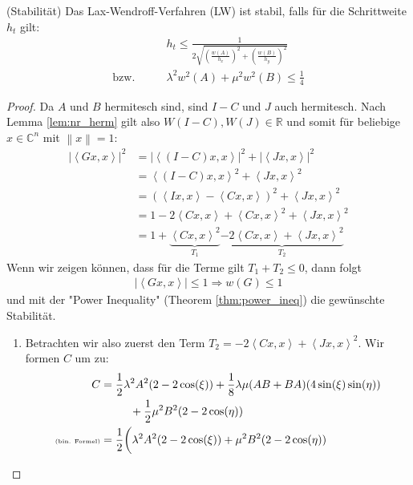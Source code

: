 \begin{thm}(Stabilität)
    Das Lax-Wendroff-Verfahren (LW) ist stabil, falls für die Schrittweite $h_t$ gilt:
    \begin{align}
        & h_t  \le \frac{1}{2 \sqrt{ (\frac{w(A)}{h_x})^2 + (\frac{w(B)}{h_y})^2 } } \\
        \text{bzw.} \qquad & \lambda^2 w^2(A) + \mu^2 w^2(B) \le \frac{1}{4} \label{eq:ass_stab}
    \end{align}
\end{thm}
\begin{proof}
    Da $A$ und $B$ hermitesch sind, sind $I-C$ und $J$ auch hermitesch. Nach Lemma \ref{lem:nr_herm} gilt also $W(I-C), W(J) \in \mathbb{R}$ und somit für beliebige $x \in \mathbb{C}^n$ mit $\left\| x \right\| = 1$:
    \begin{align}
        |\left< Gx,x \right>|^2 & = |\left< (I-C)x,x \right>|^2+ |\left< Jx,x \right>|^2 \nonumber \\
        & = \left< (I-C)x,x \right>^2+ \left< Jx,x \right>^2 \nonumber \\
        & = (\left< Ix,x \right> - \left< Cx,x \right>)^2+ \left< Jx,x \right>^2 \nonumber \\
        & = 1 - 2 \left<Cx,x \right> + \left<Cx,x \right>^2 + \left< Jx,x \right>^2 \nonumber \\
        & = 1  + \underbrace{\left<Cx,x \right>^2 }_\text{$T_1$}  \underbrace{- 2 \left<Cx,x \right> + \left< Jx,x \right>^2}_\text{$T_2$} \label{eq:goal_stab}
    \end{align}
    Wenn wir zeigen können, dass für die Terme gilt $T_1+T_2 \le 0$, dann folgt 
    \begin{align}
        |\left< Gx,x \right>| \le 1 \Rightarrow w(G) \le 1
    \end{align}
    und mit der "Power Inequality" (Theorem \ref{thm:power_ineq}) die gewünschte Stabilität.
    \begin{enumerate}[label=\protect\circled{\arabic{*}}]
        \item Betrachten wir also zuerst den Term $T_2 = - 2 \left<Cx,x \right> + \left< Jx,x \right>^2$. Wir formen $C$ um zu:
        \begin{align}
            C &= \frac{1}{2} \lambda^2 A^2 (2 - 2 \cos(\xi)) + \frac{1}{8} \lambda \mu  (AB+BA) (4 \sin(\xi)\sin(\eta)) \nonumber \\
            & \phantom{mmm} + \frac{1}{2} \mu^2 B^2 (2 - 2 \cos(\eta) ) \nonumber \\
            \text{\tiny(bin. Formel)} &= \frac{1}{2} \biggl( \lambda^2 A^2 (2 - 2\cos(\xi)) + \mu^2 B^2 (2 - 2\cos(\eta) ) \nonumber \\

\end{align}
\end{enumerate}
\end{proof}

